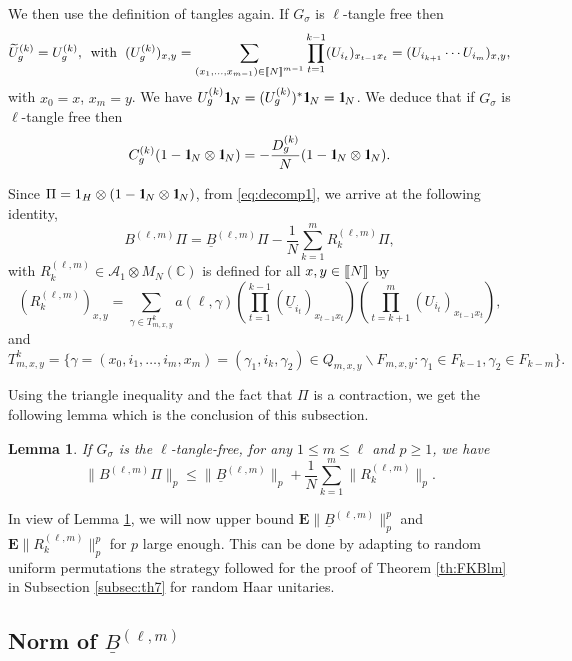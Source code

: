 \documentclass[11pt]{article}
\newtheorem{lemma}{Lemma}[section]
\newcommand{\cA}{\mathcal{A}}
\newcommand{\dE}{\mathbf {E}}
\newcommand{\dC}{\mathbb {C}}
\newcommand{\PAR}[1]{{{\left(#1\right)}}} %
\newcommand{\uB}{\underline{B}}
\newcommand{\1}{1\!\!{\sf I}}
\newcommand{\IND}{\1}
\newcommand{\INT}[1]{{{\left[\hspace{-1.4pt}\left[#1\right]\hspace{-1.4pt}\right]}}}
\begin{document}
\vspace{-10pt}

We then use the definition of tangles again. If $G_\sigma$ is $\ell$-tangle free then 
$$
 \widetilde U_{g}^{(k)}  = U_{g}^{(k)}, 
\, \hbox{ with } \; ( U_{g}^{(k)} )_{x,y}=  \sum_{(x_1,\ldots,x_{m-1})\in \INT{N}^{m-1} }\prod_{t=1}^{k-1} (  U_{i_t} )_{x_{t-1} x_{t} } = ( U_{i_{k+1}} \cdots U_{i_m} )_{x,y} , 
$$
with $x_0 = x$, $x_m= y$. 
We have $U_g^{(k)} \IND_N = (U_g^{(k)})^* \IND_N = \IND_N$. We deduce that if $G_\sigma$ is $\ell$-tangle free then 
$$
C^{(k)}_g ( 1- \IND_N \otimes \IND_N ) = - \frac {D^{(k)}_g} N   ( 1- \IND_N \otimes \IND_N ).
$$

Since $\Pi = 1_{H} \otimes (1- \IND_N \otimes \IND_N )$, from \eqref{eq:decomp1}, we arrive at the following identity, 
$$
B^{(\ell,m)} \Pi = \underline B^{(\ell,m)} \Pi - \frac 1 N \sum_{k=1}^m R_k^{(\ell,m)}  \Pi, 
$$
with $R_k^{(\ell,m)} \in \cA_1 \otimes M_N(\dC)$ is defined for all $x,y \in \INT{N}$ by 
\begin{equation}\label{eq:defRk}
(R_k^{(\ell,m)})_{x,y} = \sum_{\gamma \in T^k_{m,x,y}} a(\ell,\gamma) \PAR{ \prod_{t=1}^{k-1} ( \underline U_{i_t} )_{x_{t-1} x_{t} } } \PAR{\prod_{t = k+1}^{m} ( U_{i_t} )_{x_{t-1} x_{t} }},
\end{equation}
and 
$
T^k_{m,x,y} = \{ \gamma = (x_0,i_1,\ldots,i_m,x_m) = (\gamma_1,i_k,\gamma_2) \in Q_{m,x,y} \backslash F_{m,x,y} : \gamma_1 \in F_{k-1}, \gamma_2 \in F_{k-m}\}.
$

Using the triangle inequality and the fact that $\Pi$ is a contraction, we get the following lemma which is the conclusion of this subsection.
\begin{lemma}\label{le:decomp}
If $G_\sigma$ is the $\ell$-tangle-free, for any $1 \leq m \leq \ell$ and $p \geq 1$, we have 
$$
\| B^{(\ell,m)} \Pi \|_p  \leq \| \underline B^{(\ell,m)} \|_p  + \frac 1 N \sum_{k=1}^m \| R_k^{(\ell,m)}  \|_p.$$
\end{lemma}

In view of Lemma \ref{le:decomp}, we will now upper bound $\dE \| \uB^{(\ell,m)}\|^p_p$ and  $\dE \| R_k^{(\ell,m)}\|^p_p$ for $p$ large enough. This can be done by adapting to random uniform permutations the strategy followed for the proof of Theorem \ref{th:FKBlm} in Subsection \ref{subsec:th7} for random Haar unitaries. 

\subsection{Norm of $\underline B^{(\ell,m)}$}
\end{document}
